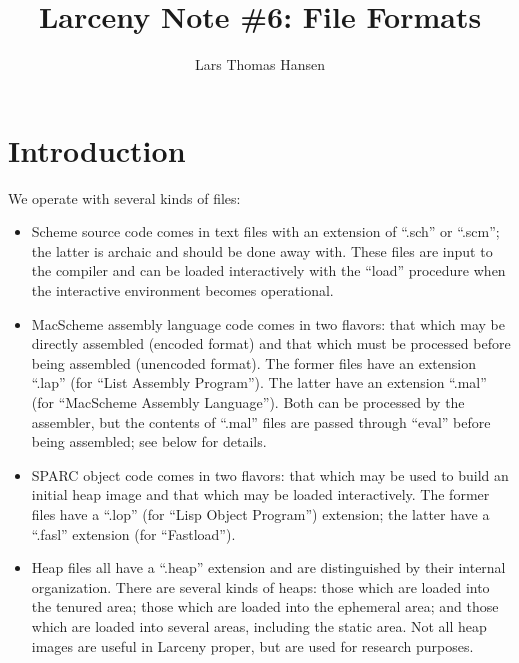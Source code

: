 


\title{Larceny Note \#6: File Formats}
\author{Lars Thomas Hansen}


\maketitle

\section{Introduction}

We operate with several kinds of files:

\begin{itemize}
\item 
Scheme source code comes in text files with an extension of ``.sch'' or
``.scm''; the latter is archaic and should be done away with. These files
are input to the compiler and can be loaded interactively with the ``load''
procedure when the interactive environment becomes operational.

\item
MacScheme assembly language code comes in two flavors: that which may be
directly assembled (encoded format) and that which must be processed before
being assembled (unencoded format). The former files have an extension ``.lap''
(for ``List Assembly Program''). The latter have an extension ``.mal'' (for
``MacScheme Assembly Language''). Both can be processed by the assembler,
but the contents of ``.mal'' files are passed through ``eval'' before being
assembled; see below for details.

\item
SPARC object code comes in two flavors: that which may be used to build an
initial heap image and that which may be loaded interactively. The former
files have a ``.lop'' (for ``Lisp Object Program'') extension; the latter
have a ``.fasl'' extension (for ``Fastload'').

\item
Heap files all have a ``.heap'' extension and are distinguished by their
internal organization. There are several kinds of heaps: those which are
loaded into the tenured area; those which are loaded into the ephemeral
area; and those which are loaded into several areas, including the static
area. Not all heap images are useful in Larceny proper, but are used for
research purposes.

\end{itemize}

